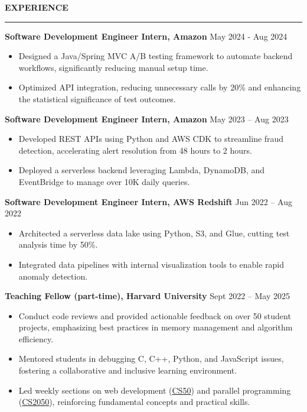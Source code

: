 \documentclass[11pt,a4paper]{article}
\newcommand{\sectionheading}[1]{\vspace{0.2cm}\textbf{\Large #1}\vspace{0.1cm}\hrule\vspace{0.3cm}}
\newcommand{\daterange}[1]{\hfill{#1}}
\begin{document}
\sectionheading{EXPERIENCE}

\textbf{Software Development Engineer Intern, Amazon} \hfill \daterange{May 2024 - Aug 2024}
\begin{itemize}[leftmargin=*,nosep]
    \item Designed a Java/Spring MVC A/B testing framework to automate backend workflows, significantly reducing manual setup time.
    \item Optimized API integration, reducing unnecessary calls by 20\% and enhancing the statistical significance of test outcomes.
\end{itemize}

\medskip
\textbf{Software Development Engineer Intern, Amazon} \hfill \daterange{May 2023 -- Aug 2023}
\smallskip

\begin{itemize}[leftmargin=*,nosep]
    \item Developed REST APIs using Python and AWS CDK to streamline fraud detection, accelerating alert resolution from 48 hours to 2 hours.
    \item Deployed a serverless backend leveraging Lambda, DynamoDB, and EventBridge to manage over 10K daily queries.
\end{itemize}

\medskip
\textbf{Software Development Engineer Intern, AWS Redshift} \hfill \daterange{Jun 2022 -- Aug 2022}
\begin{itemize}[leftmargin=*,nosep]
    \item Architected a serverless data lake using Python, S3, and Glue, cutting test analysis time by 50\%.
    \item Integrated data pipelines with internal visualization tools to enable rapid anomaly detection.
\end{itemize}

\medskip
\textbf{Teaching Fellow (part-time), Harvard University} \hfill \daterange{Sept 2022 -- May 2025}
\begin{itemize}[leftmargin=*,nosep]
    \item Conduct code reviews and provided actionable feedback on over 50 student projects, emphasizing best practices in memory management and algorithm efficiency.
    \item Mentored students in debugging C, C++, Python, and JavaScript issues, fostering a collaborative and inclusive learning environment.
    \item Led weekly sections on web development (\href{https://cs50.harvard.edu/college/2023/fall/}{CS50}) and parallel programming (\href{https://sites.google.com/g.harvard.edu/cs-2050/syllabus}{CS2050}), reinforcing fundamental concepts and practical skills.
\end{itemize}
\end{document}

